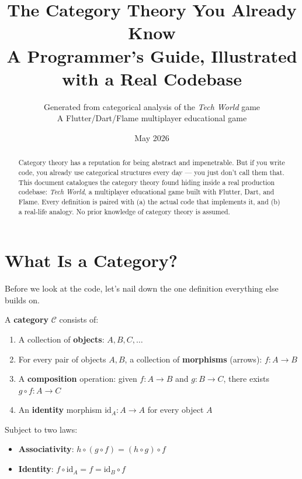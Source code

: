 \documentclass[12pt,a4paper]{article}
\title{\Huge\bfseries The Category Theory You Already Know\\[0.5em]
  \Large A Programmer's Guide, Illustrated with a Real Codebase}
\author{Generated from categorical analysis of the \emph{Tech World} game\\[0.3em]
  \small A Flutter/Dart/Flame multiplayer educational game}
\date{May 2026}
\theoremstyle{definition}
\theoremstyle{plain}
\theoremstyle{remark}
\begin{document}
\maketitle

\begin{abstract}
Category theory has a reputation for being abstract and impenetrable.
But if you write code, you already use categorical structures every day
--- you just don't call them that.
This document catalogues the category theory found hiding inside a real
production codebase: \emph{Tech World}, a multiplayer educational game
built with Flutter, Dart, and Flame.
Every definition is paired with (a) the actual code that implements it,
and (b) a real-life analogy.
No prior knowledge of category theory is assumed.
\end{abstract}

\tableofcontents
\newpage

\section{What Is a Category?}

Before we look at the code, let's nail down the one definition everything
else builds on.

\begin{formal}
A \textbf{category} $\mathcal{C}$ consists of:
\begin{enumerate}
  \item A collection of \textbf{objects}: $A, B, C, \ldots$
  \item For every pair of objects $A, B$, a collection of \textbf{morphisms}
        (arrows): $f \colon A \to B$
  \item A \textbf{composition} operation: given $f \colon A \to B$ and
        $g \colon B \to C$, there exists $g \circ f \colon A \to C$
  \item An \textbf{identity} morphism $\mathrm{id}_A \colon A \to A$ for every object $A$
\end{enumerate}
Subject to two laws:
\begin{itemize}
  \item \textbf{Associativity}: $h \circ (g \circ f) = (h \circ g) \circ f$
  \item \textbf{Identity}: $f \circ \mathrm{id}_A = f = \mathrm{id}_B \circ f$
\end{itemize}
\end{formal}
\end{document}
